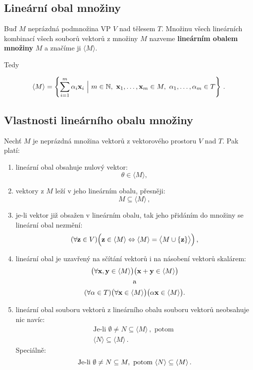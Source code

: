 \subsection*{Lineární obal množiny}

Buď $M$ neprázdná podmnožina VP $V$ nad tělesem $T$. Množinu všech lineárních
kombinací všech souborů vektorů z množiny $M$ nazveme \textbf{lineárním obalem
      množiny} $M$ a značíme ji $\langle M \rangle $.

Tedy

\[ \langle  M \rangle
      =\left\{\sum_{i=1}^{m}\alpha_{i}\vx_{i}\ \Big|\ m\in \N,\ \vx_1,\dots,\vx_m\in M,\ \alpha_1,\dots,\alpha_m\in T\right\}\,. \]

\subsection*{Vlastnosti lineárního obalu množiny}

Nechť $M$ je neprázdná množina vektorů z vektorového prostoru $V$ nad $T$. Pak
platí:

\begin{enumerate}
      \item lineární obal obsahuje nulový vektor:
            \[ \theta\in \langle M \rangle , \]
      \item vektory z $M$ leží v jeho lineárním obalu, přesněji:
            \[ M \subseteq \langle M \rangle\,, \]
      \item je-li vektor již obsažen v lineárním obalu, tak jeho přidáním do množiny se
            lineární obal nezmění:
            \[ (\forall \mathbf{z}\in V)\Big(\mathbf{z}\in\langle M \rangle    \Leftrightarrow \langle  M  \rangle =\big\langle  M\cup\{\mathbf{z}\}  \big\rangle\Big)\,, \]
      \item lineární obal je uzavřený na sčítání vektorů i na násobení vektorů skalárem:
            \begin{gather*}
                  \big(\forall\mathbf{x},\mathbf{y}\in\langle  M \rangle\big)\big(\mathbf{x}+\mathbf{y}\in\langle M \rangle\big)\\
                  \quad\text{a}\quad\\
                  (\forall\alpha\in T)\big(\forall\mathbf{x}\in\langle M \rangle\big)\big(\alpha \mathbf{x}\in\langle M \rangle\big) .
            \end{gather*}
      \item lineární obal souboru vektorů z lineárního obalu souboru vektorů neobsahuje nic
            navíc:
            \begin{gather*}
                  \text{Je-li } \emptyset \neq N\subseteq \langle  M \rangle\,,\text{ potom }\\
                  \langle  N  \rangle \subseteq \langle  M \rangle\,.
            \end{gather*}
            Speciálně:
            \[ \text{Je-li } \emptyset \neq N\subseteq M,\text{ potom }\\
                  \langle  N  \rangle \subseteq \langle  M \rangle\,. \]
\end{enumerate}

